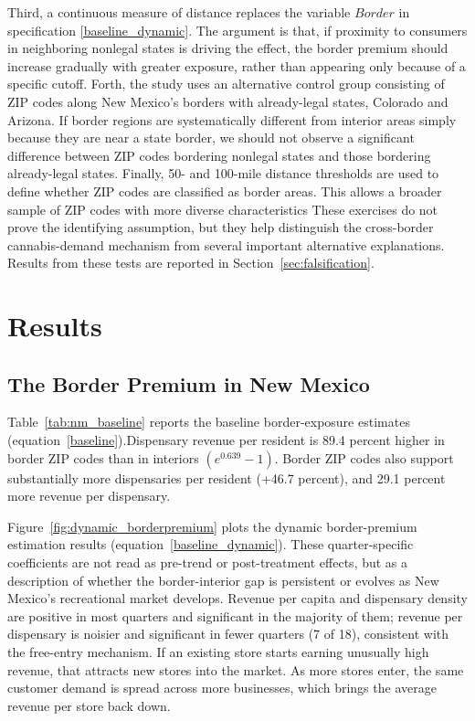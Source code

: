 \documentclass[english,12pt]{article}
\begin{document}
 Third, a continuous measure of distance replaces the variable $Border$ in specification \ref{baseline_dynamic}. The argument is that, if proximity to consumers in neighboring nonlegal states is driving the effect, the border premium should increase gradually with greater exposure, rather than appearing only because of a specific cutoff. Forth, the study uses an alternative control group consisting of ZIP codes along New Mexico’s borders with already-legal states, Colorado and Arizona. If border regions are systematically different from interior areas simply because they are near a state border, we should not observe a significant difference between ZIP codes bordering nonlegal states and those bordering already-legal states.
 Finally, 50- and 100-mile distance thresholds are used to define whether ZIP codes are classified as border areas. This allows a broader sample of ZIP codes with more diverse characteristics These exercises do not prove the identifying assumption, but they help distinguish the cross-border cannabis-demand mechanism from several important alternative explanations. Results from these tests are reported in Section~\ref{sec:falsification}.

\section{Results}
\label{sec:result1}


\subsection{The Border Premium in New Mexico}

Table~\ref{tab:nm_baseline} reports the baseline border-exposure estimates (equation~\ref{baseline}).Dispensary revenue per resident is 89.4 percent higher in border ZIP codes than in interiors \(\left(e^{0.639}-1\right)\).
Border ZIP codes also support substantially more dispensaries per resident (+46.7 percent), and 29.1 percent more revenue per
dispensary. 

Figure~\ref{fig:dynamic_borderpremium} plots the dynamic border-premium estimation results (equation~\ref{baseline_dynamic}).
These quarter-specific coefficients are not read as pre-trend or post-treatment effects, but as a description of whether the border-interior gap is persistent or evolves as
New Mexico's recreational market develops. Revenue per capita and dispensary density are positive in most
quarters and significant in the majority of them;
revenue per dispensary is noisier and significant in fewer quarters (7 of 18), consistent with the free-entry
mechanism. If an existing store starts earning unusually high revenue, that attracts new stores into the market. As more stores enter, the same customer demand is spread across more businesses, which brings the average revenue per store back down.
\end{document}
